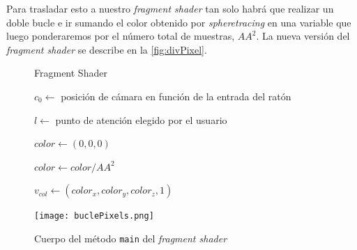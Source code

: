 Para trasladar esto a nuestro \textit{fragment shader} tan solo habrá que realizar un doble bucle e ir sumando el color obtenido por \textit{spheretracing} en una variable que luego ponderaremos por el número total de muestras, $AA^2$. La nueva versión del \textit{fragment shader} se describe en la \autoref{fig:divPixel}.

\begin{figure}[ht!]
    \centering
    \begin{minipage}{0.69\textwidth}
      \begin{algorithm}[H]
            \caption{Fragment Shader}
            $c_0 \gets $ posición de cámara en función de la entrada del ratón

            $l\gets $ punto de atención elegido por el usuario
            
            $color\gets (0,0,0)$
            

            $color \gets color / AA^2$
            
            $v_{col} \gets (color_x, color_y, color_z, 1)$
        \end{algorithm}
    \end{minipage}%
    \hfill
    \begin{minipage}{0.31\textwidth}
        \texttt{[image: buclePixels.png]}
    \end{minipage}
    \caption{Cuerpo del método \texttt{main} del \textit{fragment shader}}
    \label{fig:divPixel}
\end{figure}

